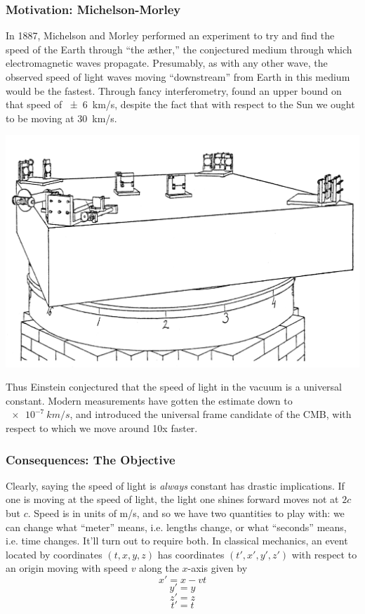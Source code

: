 \documentclass[10pt]{beamer}
\begin{document}
\begin{frame}
  \frametitle{Motivation: Michelson-Morley}
  In 1887, Michelson and Morley performed an experiment to try and find the speed of the Earth through ``the \ae ther,'' the conjectured medium through which electromagnetic waves propagate.
  Presumably, as with any other wave, the observed speed of light waves moving ``downstream'' from Earth in this medium would be the fastest.
  Through fancy interferometry, found an upper bound on that speed of \SI{\pm 6}{km/s}, despite the fact that with respect to the Sun we ought to be moving at \SI{30}{km/s}.
  \begin{center}
    \includegraphics[scale=0.4]{mich-mor.png}
  \end{center}
  Thus Einstein conjectured that the speed of light in the vacuum is a universal constant.
  Modern measurements have gotten the estimate down to $\SI{e-7}{km/s}$, and introduced the universal frame candidate of the CMB, with respect to which we move around 10x faster.
\end{frame}

\begin{frame}
  \frametitle{Consequences: The Objective}
  Clearly, saying the speed of light is \textit{always} constant has drastic implications.
  If one is moving at the speed of light, the light one shines forward moves not at $2c$ but $c$.
  Speed is in units of \si{m/s}, and so we have two quantities to play with: we can change what ``meter'' means, i.e. lengths change, or what ``seconds'' means, i.e. time changes.
  It'll turn out to require both.
  In classical mechanics, an event located by coordinates $(t,x,y,z)$ has coordinates $(t',x',y',z')$ with respect to an origin moving with speed $v$ along the $x$-axis given by
  \[
    x'=x-vt
  \]
  \[
    y'=y
  \]
  \[
    z'=z
  \]
  \[
    t'=t
  \]

\end{frame}
\end{document}

